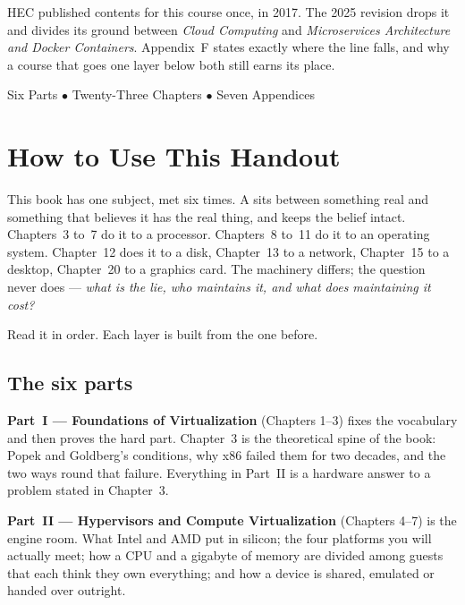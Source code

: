 \begin{center}
\begin{tcolorbox}[enhanced, width=0.86\textwidth, colback=lightbg,
  colframe=primary, boxrule=0pt, leftrule=4pt, arc=2pt, top=6pt, bottom=6pt]
\smallskip
HEC published contents for this course once, in 2017. The 2025 revision drops
it and divides its ground between \emph{Cloud Computing} and \emph{Microservices
Architecture and Docker Containers}. Appendix~F states exactly where the line
falls, and why a course that goes one layer below both still earns its place.
\end{tcolorbox}

\vspace{0.9cm}
{\small\color{gray!60!black}Six Parts $\bullet$ Twenty-Three Chapters $\bullet$ Seven Appendices}
\vspace{1cm}
\end{center}

\newpage

\chapter*{How to Use This Handout}

This book has one subject, met six times. A  sits
between something real and something that believes it has the real thing, and
keeps the belief intact. Chapters~3 to~7 do it to a processor. Chapters~8
to~11 do it to an operating system. Chapter~12 does it to a disk, Chapter~13
to a network, Chapter~15 to a desktop, Chapter~20 to a graphics card. The
machinery differs; the question never does --- \emph{what is the lie, who
maintains it, and what does maintaining it cost?}

Read it in order. Each layer is built from the one before.

\section*{The six parts}

\textbf{Part~I --- Foundations of Virtualization} (Chapters 1--3) fixes the
vocabulary and then proves the hard part. Chapter~3 is the theoretical spine of
the book: Popek and Goldberg's conditions, why x86 failed them for two decades,
and the two ways round that failure. Everything in Part~II is a hardware answer
to a problem stated in Chapter~3.

\textbf{Part~II --- Hypervisors and Compute Virtualization} (Chapters 4--7) is
the engine room. What Intel and AMD put in silicon; the four platforms you will
actually meet; how a CPU and a gigabyte of memory are divided among guests that
each think they own everything; and how a device is shared, emulated or handed
over outright.

